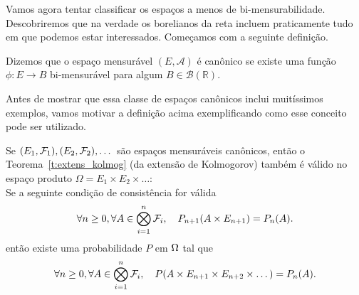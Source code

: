 Vamos agora tentar classificar os espaços a menos de bi-mensurabilidade.
Descobriremos que na verdade os borelianos da reta incluem praticamente tudo em que podemos estar interessados.
Começamos com a seguinte definição.

\begin{definition}
  Dizemos que o espaço mensurável $(E, \mathcal{A})$ é canônico  se existe uma função $\phi: E \to B$ bi-mensurável para algum $B \in \mathcal{B}(\mathbb{R})$.
\end{definition}

Antes de mostrar que essa classe de espaços canônicos inclui muitíssimos exemplos, 
vamos motivar a definição acima exemplificando como esse conceito pode ser utilizado.

\begin{theorem}
  Se $(E_1,{\mathcal F}_1), (E_2,{\mathcal F}_2), \dots$ são espaços mensuráveis canônicos, então o Teorema~\ref{t:extens_kolmog} (da extensão de Kolmogorov)
  também é válido no espaço produto $\Omega = E_1 \times E_2 \times \dots$: \\
  Se a seguinte condição de consistência for válida
  \begin{equation}
   \forall n\ge 0, \forall A \in \bigotimes_{i=1}^n {\mathcal F}_i,\quad P_{n+1}(A\times E_{n+1})=P_n(A).
  \end{equation}
então existe uma probabilidade $P$ em $\Omega$ tal que 
    \begin{equation}
   \forall n\ge 0, \forall A \in \bigotimes_{i=1}^n {\mathcal F}_i,\quad P(A\times E_{n+1}\times E_{n+2}\times\dots )=P_n(A).
  \end{equation}
\end{theorem}

